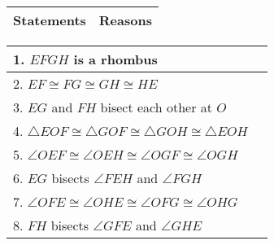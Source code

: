 
\begin{center}
\begin{tabularx}{\textwidth}{|Y|Y|}
\hline
\textbf{Statements} & \textbf{Reasons}  \\
\hline
\end{tabularx} 
\begin{tabularx}{\textwidth}{|X|X|}
\hline
1. \(EFGH\) is a rhombus & \\
\hline
2. \(EF \cong FG \cong GH \cong HE\) & \\
\hline
3. \(EG\) and \(FH\) bisect each other at \(O\) & \\
\hline
4. \(\triangle EOF \cong \triangle GOF \cong \triangle GOH \cong \triangle EOH\) & \\
\hline
5. \(\angle OEF \cong \angle OEH \cong \angle OGF \cong \angle OGH\) & \\
\hline
6. \(EG\) bisects \(\angle FEH\) and \(\angle FGH\) & \\
\hline
7. \(\angle OFE \cong \angle OHE \cong \angle OFG \cong \angle OHG\) & \\
\hline
8. \(FH\) bisects \(\angle GFE\) and \(\angle GHE\) & \\
\hline
\end{tabularx}
\end{center}
